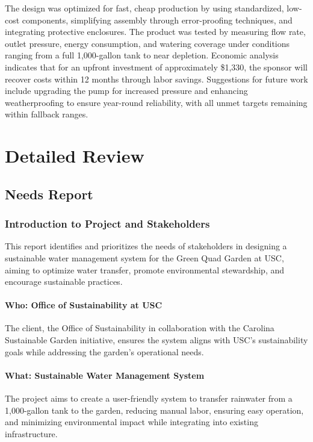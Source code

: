 \documentclass[12pt]{report}
\begin{document}
The design was optimized for fast, cheap production by using standardized, low-cost components, simplifying assembly through error-proofing techniques, and integrating protective enclosures. The product was tested by measuring flow rate, outlet pressure, energy consumption, and watering coverage under conditions ranging from a full 1,000-gallon tank to near depletion. Economic analysis indicates that for an upfront investment of approximately \$1,330, the sponsor will recover costs within 12 months through labor savings. Suggestions for future work include upgrading the pump for increased pressure and enhancing weatherproofing to ensure year-round reliability, with all unmet targets remaining within fallback ranges.


\part{Detailed Review}
\chapter{Needs Report}
\section{Introduction to Project and Stakeholders}

This report identifies and prioritizes the needs of stakeholders in designing a sustainable water management system for the Green Quad Garden at USC, aiming to optimize water transfer, promote environmental stewardship, and encourage sustainable practices.

\subsection{Who: Office of Sustainability at USC}
The client, the Office of Sustainability in collaboration with the Carolina Sustainable Garden initiative, ensures the system aligns with USC's sustainability goals while addressing the garden’s operational needs.

\subsection{What: Sustainable Water Management System}
The project aims to create a user-friendly system to transfer rainwater from a 1,000-gallon tank to the garden, reducing manual labor, ensuring easy operation, and minimizing environmental impact while integrating into existing infrastructure.
\end{document}
